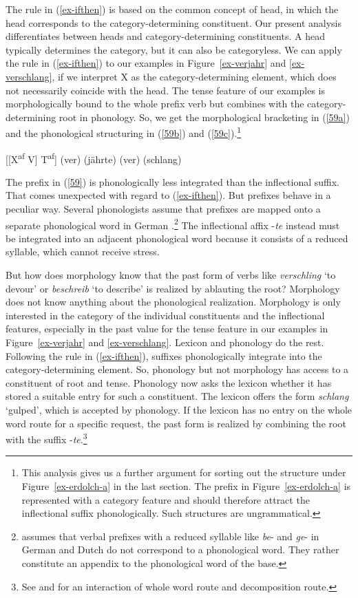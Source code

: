 \documentclass[output=paper
  ,nobabel
  ,draftmode
  ,colorlinks, citecolor=brown
]{langscibook}
\begin{document}
The rule in (\ref{ex-ifthen}) is based on the common concept of head, in which the head corresponds to the category-determining constituent. Our present analysis differentiates between heads and category-determining constituents. A head typically determines the category, but it can also be categoryless. We can apply the rule in (\ref{ex-ifthen}) to our examples in Figure~\ref{ex-verjahr} and \ref{ex-verschlang}, if we interpret X as the category-determining element, which does not necessarily coincide with the head. The tense feature of our examples is morphologically bound to the whole prefix verb but combines with the category-determining root in phonology. So, we get the morphological bracketing in (\ref{59a}) and the phonological structuring in (\ref{59b}) and (\ref{59c}).\footnote{This analysis gives us a further argument for sorting out the structure under Figure~\ref{ex-erdolch-a} in the last section. The prefix in Figure~\ref{ex-erdolch-a} is represented with a category feature and should therefore attract the inflectional suffix phonologically. Such structures are ungrammatical.}

\eal\label{59}
\ex\label{59a}
[[X\textsuperscript{af} V] T\textsuperscript{af}]
\ex\label{59b}
 (ver) (jährte)
 \ex\label{59c}
 (ver) (schlang)
\zl

\noindent The prefix in (\ref{59}) is phonologically less integrated than the inflectional suffix. That comes unexpected with regard to (\ref{ex-ifthen}). But prefixes behave in a peculiar way. Several phonologists assume that prefixes are mapped onto a separate phonological word in German \citep[cf.][Section~3.4]{Wiese1996}.\footnote{\citet{Booij1985} assumes that verbal prefixes with a reduced syllable like \emph{be}- and \emph{ge}- in German and Dutch do not correspond to a phonological word. They rather constitute an appendix to the phonological word of the base.} The inflectional affix -\emph{te} instead must be integrated into an adjacent phonological word because it consists of a reduced syllable, which cannot receive stress.

But how does morphology know that the past form of verbs like \emph{verschling} `to devour' or \emph{beschreib} `to describe' is realized by ablauting the root? Morphology does not know anything about the phonological realization. Morphology is only interested in the category of the individual constituents and the inflectional features, especially in the past value for the tense feature in our examples in Figure~\ref{ex-verjahr} and \ref{ex-verschlang}. Lexicon and phonology do the rest. Following the rule in (\ref{ex-ifthen}), suffixes phonologically integrate into the category-determining element. So, phonology but not morphology has access to a constituent of root and tense.
Phonology now asks the lexicon whether it has stored a suitable entry for such a constituent. The lexicon offers the form \emph{schlang} `gulped', which is accepted by phonology. If the lexicon has no entry on the whole word route for a specific request, the past form is realized by combining the root with the suffix -\emph{te}.\footnote{See \citet{CaramazzaEtAl1988} and \citet{Plag2006} for an interaction of whole word route and decomposition route.}
\end{document}
